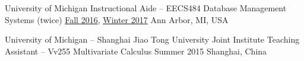 
\begin{cvteachingexps}

  \cvteachingexp
    {University of Michigan} %
    {Instructional Aide – EECS484 Database Management Systems (twice)} %
    {\href{http://web.eecs.umich.edu/~aprakash/eecs484/index.html}{Fall 2016}, \href{http://web.eecs.umich.edu/~mozafari/eecs484/}{Winter 2017}} %
    {Ann Arbor, MI, USA} %

  \cvteachingexp
    {University of Michigan – Shanghai Jiao Tong University Joint Institute} %
    {Teaching Assistant – Vv255 Multivariate Calculus} %
    {Summer 2015} %
    {Shanghai, China} %

\end{cvteachingexps}